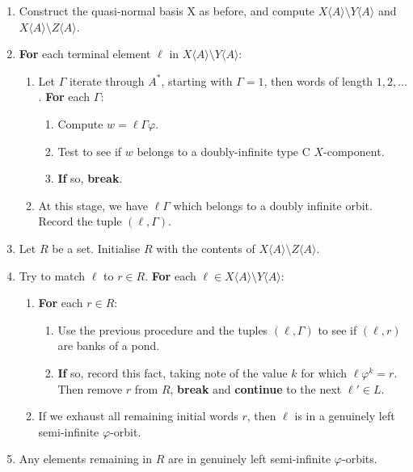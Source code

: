 \documentclass[12pt]{article}
\let\phi\varphi
\def\ofA{\langle A \rangle}
\newcommand\alert\textbf
\begin{document}
\begin{enumerate}
\item Construct the quasi-normal basis X as before, and compute $X\ofA \setminus Y\ofA$ and $X\ofA \setminus Z\ofA$.
\item \label{it:terminal_banks}
	\alert{For} each terminal element $\ell$ in $X\ofA \setminus Y\ofA$:
	
	\begin{enumerate}
		\item \label{it:iterate_descendants}
			Let $\Gamma$ iterate through $A^*$, starting with $\Gamma=1$, then words of length $1, 2, \dotsc$. \alert{For} each $\Gamma$:
			\begin{enumerate}
				\item Compute $w = \ell\Gamma \phi$.
				\item Test to see if $w$ belongs to a doubly-infinite type C $X$-component.
				\item \alert{If} so, \alert{break}.
			\end{enumerate}
		
		\item At this stage, we have $\ell\Gamma$ which belongs to a doubly infinite orbit.  Record the tuple $(\ell, \Gamma)$.
	\end{enumerate}

\item Let $R$ be a set. Initialise $R$ with the contents of $X\ofA \setminus Z\ofA$.

\item Try to match $\ell$ to $r\in R$. \alert{For} each $\ell \in X\ofA \setminus Y\ofA$:
	\begin{enumerate}
	\item \alert{For} each $r \in R$:
		\begin{enumerate}
		\item Use the previous procedure and the tuples $(\ell, \Gamma)$ to see if $(\ell, r)$ are banks of a pond.
		\item \alert{If} so, record this fact, taking note of the value $k$ for which $\ell\phi^k = r$. Then remove $r$ from $R$, \alert{break} and \alert{continue} to the next $\ell' \in L$.
		\end{enumerate}
		\item If we exhaust all remaining initial words $r$, then $\ell$ is in a genuinely left semi-infinite $\phi$-orbit.
	\end{enumerate}
	\item Any elements remaining in $R$ are in genuinely left semi-infinite $\phi$-orbits.
\end{enumerate}
\end{document}
